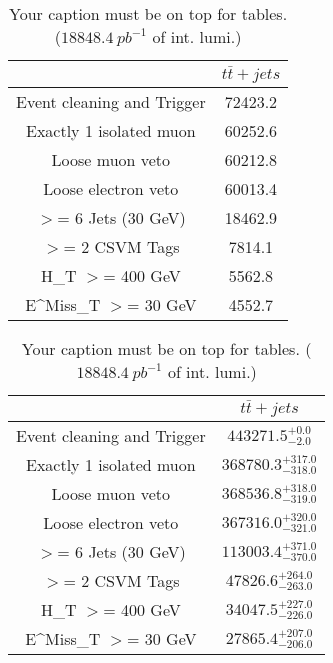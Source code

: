 \documentclass{article}
\begin{document}
\begin{table}
\caption{Your caption must be on top for tables. ($18848.4~pb^{-1}$ of int. lumi.)}
\label{tab:}
\centering
\begin{tabular}{|c|c|}
\toprule
&$t\bar{t}+jets$	\\

\midrule
Event cleaning and Trigger&	72423.2	\\

Exactly 1 isolated muon&	60252.6	\\

Loose muon veto&	60212.8	\\

Loose electron veto&	60013.4	\\

$>$= 6 Jets (30 GeV)&	18462.9	\\

$>$= 2 CSVM Tags&	7814.1	\\

H_{T} $>$=  400 GeV&	5562.8	\\

E^{Miss}_{T} $>$=  30 GeV&	4552.7	\\

\bottomrule
\end{tabular}
\end{table}
\begin{table}
\caption{Your caption must be on top for tables. ($18848.4~pb^{-1}$ of int. lumi.)}
\label{tab:}
\centering
\begin{tabular}{|c|c|}
\toprule
&$t\bar{t}+jets$	\\

\midrule
Event cleaning and Trigger&	$443271.5^{+0.0}_{-2.0}$	\\

Exactly 1 isolated muon&	$368780.3^{+317.0}_{-318.0}$	\\

Loose muon veto&	$368536.8^{+318.0}_{-319.0}$	\\

Loose electron veto&	$367316.0^{+320.0}_{-321.0}$	\\

$>$= 6 Jets (30 GeV)&	$113003.4^{+371.0}_{-370.0}$	\\

$>$= 2 CSVM Tags&	$47826.6^{+264.0}_{-263.0}$	\\

H_{T} $>$=  400 GeV&	$34047.5^{+227.0}_{-226.0}$	\\

E^{Miss}_{T} $>$=  30 GeV&	$27865.4^{+207.0}_{-206.0}$	\\

\bottomrule
\end{tabular}
\end{table}
\end{document}
